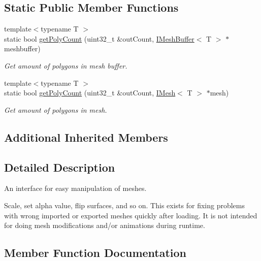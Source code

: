 \subsection*{Static Public Member Functions}
\begin{DoxyCompactItemize}
\item 
{\footnotesize template$<$typename T $>$ }\\static bool \hyperlink{classirr_1_1scene_1_1IMeshManipulator_a641ecc0aae0b0372071c2770cdcd9f2f}{get\+Poly\+Count} (uint32\+\_\+t \&out\+Count, \hyperlink{classirr_1_1scene_1_1IMeshBuffer}{I\+Mesh\+Buffer}$<$ T $>$ $\ast$meshbuffer)
\begin{DoxyCompactList}\small\item\em Get amount of polygons in mesh buffer. \end{DoxyCompactList}\item 
{\footnotesize template$<$typename T $>$ }\\static bool \hyperlink{classirr_1_1scene_1_1IMeshManipulator_acb922b739ebdf1b3bdb239c557e51cae}{get\+Poly\+Count} (uint32\+\_\+t \&out\+Count, \hyperlink{classirr_1_1scene_1_1IMesh}{I\+Mesh}$<$ T $>$ $\ast$mesh)
\begin{DoxyCompactList}\small\item\em Get amount of polygons in mesh. \end{DoxyCompactList}\end{DoxyCompactItemize}
\subsection*{Additional Inherited Members}


\subsection{Detailed Description}
An interface for easy manipulation of meshes. 

Scale, set alpha value, flip surfaces, and so on. This exists for fixing problems with wrong imported or exported meshes quickly after loading. It is not intended for doing mesh modifications and/or animations during runtime. 

\subsection{Member Function Documentation}
